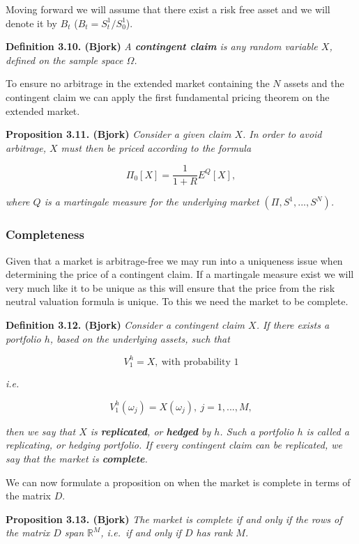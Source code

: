 \documentclass[a4paper,12pt,openany]{book}
\begin{document}
Moving forward we will assume that there exist a risk free asset and we will denote it by \(B_t\) (\(B_t=S^1_t/S^1_0\)).

\textbf{Definition 3.10. (Bjork)} \emph{A \textbf{contingent claim} is any random variable \(X\), defined on the sample space \(\Omega\).}

To ensure no arbitrage in the extended market containing the \(N\) assets and the contingent claim we can apply the first fundamental pricing theorem on the extended market.

\textbf{Proposition 3.11. (Bjork)} \emph{Consider a given claim \(X\). In order to avoid arbitrage, \(X\) must then be priced according to the formula}

\[
\Pi_0[X]=\frac{1}{1+R}E^Q[X],\tag{3.10}
\]

\emph{where \(Q\) is a martingale measure for the underlying market \((\Pi,S^1,...,S^N)\).}

\hypertarget{completeness}{%
\subsubsection{Completeness}\label{completeness}}

Given that a market is arbitrage-free we may run into a uniqueness issue when determining the price of a contingent claim. If a martingale measure exist we will very much like it to be unique as this will ensure that the price from the risk neutral valuation formula is unique. To this we need the market to be complete.

\textbf{Definition 3.12. (Bjork)} \emph{Consider a contingent claim \(X\). If there exists a portfolio \(h\), based on the underlying assets, such that}

\[
V_1^h=X,\ \text{with probability 1}\tag{3.11}
\]

\emph{i.e.}

\[
V_1^h(\omega_j)=X(\omega_j),\ j=1,...,M,\tag{3.12}
\]

\emph{then we say that \(X\) is \textbf{replicated}, or \textbf{hedged} by \(h\). Such a portfolio \(h\) is called a replicating, or hedging portfolio. If every contingent claim can be replicated, we say that the market is \textbf{complete}.}

We can now formulate a proposition on when the market is complete in terms of the matrix \(D\).

\textbf{Proposition 3.13. (Bjork)} \emph{The market is complete if and only if the rows of the matrix \(D\) span \(\mathbb{R}^M\), i.e.~if and only if \(D\) has rank \(M\).}
\end{document}
